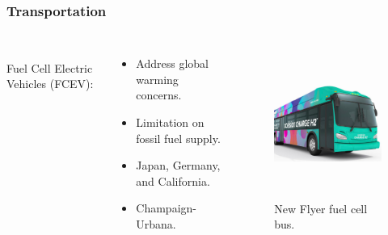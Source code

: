 \begin{frame}
\frametitle{Transportation}
\begin{columns}
	\\
    Fuel Cell Electric Vehicles (FCEV):
	\begin{itemize}
		\item Address global warming concerns.
		\item Limitation on fossil fuel supply.
		\item Japan, Germany, and California.
		\item Champaign-Urbana.
	\end{itemize}

	\begin{figure}[htbp!]
		\begin{center}
			\includegraphics[height=5cm]{images/bus.png}
		\end{center}
		\caption{New Flyer fuel cell bus.}
	\end{figure}
\end{columns}
\end{frame}


